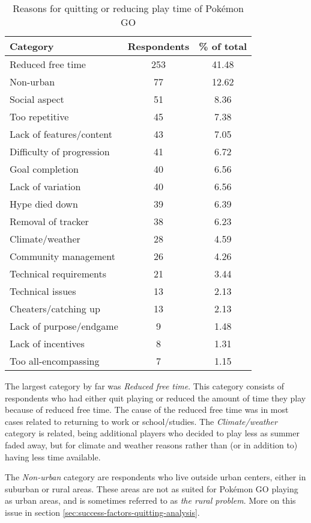 \begin{table}[h]
	\centering
	\label{tbl:reasons-for-quitting}
	\begin{tabular}{|l|c|c|}
		\hline
		\textbf{Category} & \textbf{Respondents} & \textbf{\% of total}\\
		\hline\hline
		Reduced free time & 253 & 41.48\\\hline
		Non-urban & 77 & 12.62\\\hline
		Social aspect & 51 & 8.36\\\hline
		Too repetitive & 45 & 7.38\\\hline
		Lack of features/content & 43 & 7.05\\\hline
		Difficulty of progression & 41 & 6.72\\\hline
		Goal completion & 40 & 6.56\\\hline
		Lack of variation & 40 & 6.56\\\hline
		Hype died down & 39 & 6.39\\\hline
		Removal of tracker & 38 & 6.23\\\hline
		Climate/weather & 28 & 4.59\\\hline
		Community management & 26 & 4.26\\\hline
		Technical requirements & 21 & 3.44\\\hline
		Technical issues & 13 & 2.13\\\hline
		Cheaters/catching up & 13 & 2.13\\\hline
		Lack of purpose/endgame & 9 & 1.48\\\hline
		Lack of incentives & 8 & 1.31\\\hline
		Too all-encompassing & 7 & 1.15\\\hline
	\end{tabular}
	\caption{Reasons for quitting or reducing play time of Pokémon GO}
\end{table}

The largest category by far was \emph{Reduced free time}.  This category consists of respondents who had either quit playing or reduced the amount of time they play because of reduced free time. The cause of the reduced free time was in most cases related to returning to work or school/studies. The \emph{Climate/weather} category is related, being additional players who decided to play less as summer faded away, but for climate and weather reasons rather than (or in addition to) having less time available.

The \emph{Non-urban} category are respondents who live outside urban centers, either in suburban or rural areas. These areas are not as suited for Pokémon GO playing as urban areas, and is sometimes referred to as \emph{the rural problem}. More on this issue in section \ref{sec:success-factors-quitting-analysis}.

